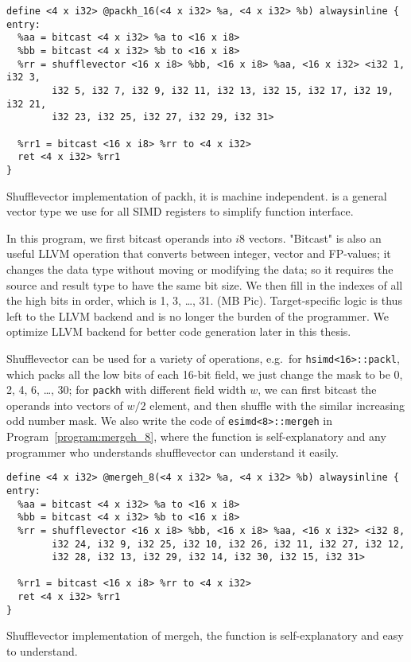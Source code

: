 \begin{program}
\begin{verbatim}
define <4 x i32> @packh_16(<4 x i32> %a, <4 x i32> %b) alwaysinline {
entry:
  %aa = bitcast <4 x i32> %a to <16 x i8>
  %bb = bitcast <4 x i32> %b to <16 x i8>
  %rr = shufflevector <16 x i8> %bb, <16 x i8> %aa, <16 x i32> <i32 1, i32 3,
        i32 5, i32 7, i32 9, i32 11, i32 13, i32 15, i32 17, i32 19, i32 21,
        i32 23, i32 25, i32 27, i32 29, i32 31>

  %rr1 = bitcast <16 x i8> %rr to <4 x i32>
  ret <4 x i32> %rr1
}
\end{verbatim}
\caption[Shufflevector implementation of packh.]{Shufflevector implementation of packh, it is machine independent. {\tt <4 x i32>} is a general vector type we use for all SIMD registers to simplify function interface.}
\label{program:packh_16}
\end{program}

In this program, we first bitcast operands into $i8$ vectors. "Bitcast" is also an useful LLVM operation that converts between integer, vector and FP-values; it changes the data type without moving or modifying the data; so it requires the source and result type to have the same bit size. We then fill in the indexes of all the high bits in order, which is 1, 3, \ldots, 31. (MB Pic). Target-specific logic is thus left to the LLVM backend and is no longer the burden of the programmer. We optimize LLVM backend for better code generation later in this thesis.

Shufflevector can be used for a variety of operations, e.g.\ for \verb|hsimd<16>::packl|, which packs all the low bits of each 16-bit field, we just change the mask to be 0, 2, 4, 6, \ldots, 30; for {\tt packh} with different field width $w$, we can first bitcast the operands into vectors of $w/2$ element, and then shuffle with the similar increasing odd number mask. We also write the code of \verb|esimd<8>::mergeh| in Program~\ref{program:mergeh_8}, where the function is self-explanatory and any programmer who understands shufflevector can understand it easily.

\begin{program}
\begin{verbatim}
define <4 x i32> @mergeh_8(<4 x i32> %a, <4 x i32> %b) alwaysinline {
entry:
  %aa = bitcast <4 x i32> %a to <16 x i8>
  %bb = bitcast <4 x i32> %b to <16 x i8>
  %rr = shufflevector <16 x i8> %bb, <16 x i8> %aa, <16 x i32> <i32 8,
        i32 24, i32 9, i32 25, i32 10, i32 26, i32 11, i32 27, i32 12,
        i32 28, i32 13, i32 29, i32 14, i32 30, i32 15, i32 31>

  %rr1 = bitcast <16 x i8> %rr to <4 x i32>
  ret <4 x i32> %rr1
}
\end{verbatim}
\caption[Shufflevector implementation of mergeh.]{Shufflevector implementation of mergeh, the function is self-explanatory and easy to understand.}
\label{program:mergeh_8}
\end{program}


